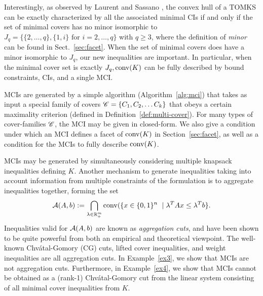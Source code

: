 Interestingly, as observed by Laurent and Sassano \cite{laurent1992characterization}, the convex hull of a TOMKS can be exactly characterized by all the associated minimal CIs if and only if the set of minimal covers has no minor isomorphic to $J_q = \{\{2,\ldots, q\}, \{1,i\} \text{ for }  i = 2, \ldots, q\}$ with $q \geq 3$, where the definition of \emph{minor} can be found in Sect.~\ref{sec:facet}. 
When the set of minimal covers does have a minor isomorphic to $J_q$, our new inequalities are important. In particular, when the minimal cover set is exactly $J_q, \operatorname{conv}(K)$ can be fully described by bound constraints, CIs, and a single MCI. 

MCIs are generated by a simple algorithm (Algorithm~\ref{alg:mci}) that takes as input a special family of covers $\mathscr{C} = \{C_1, C_2, \ldots C_k\}$ that obeys a certain maximality criterion (defined in Definition~\ref{def:multi-cover}).  For many types of cover-families $\mathscr{C}$, the MCI may be given in closed-form.
We also give a condition under which an MCI defines a facet of $\operatorname{conv}(K)$ in Section~\ref{sec:facet}, as well as a condition for the MCIs to fully describe $\operatorname{conv}(K)$. 

MCIs may be generated by simultaneously considering multiple knapsack inequalities defining $K$.
Another mechanism to generate inequalities taking into account information from multiple constraints of the formulation is to aggregate inequalities together, forming the set
\[ \mathcal{A}(A,b) := \bigcap_{\lambda \in \mathbb{R}^m_+} \operatorname{conv}(\{x \in \{0,1\}^n \ \mid \lambda^T A x \leq \lambda^T b \}. \]
Inequalities valid for $\mathcal{A}(A,b)$ are known as \emph{aggregation cuts}, and have been shown to be quite powerful from both an empirical \cite{fukasawa.goycoolea:11} and theoretical \cite{MR3844541} viewpoint.  
The well-known Chv{\'a}tal-Gomory (CG) cuts, lifted cover inequalities, and weight inequalities \cite{weismantel19970} are all aggregation cuts.  In Example~\ref{ex3}, we show that MCIs are not aggregation cuts.  
Furthermore, in Example~\ref{ex4}, we show that MCIs cannot be obtained as a (rank-1)  Chv{\'a}tal-Gomory cut from the linear system consisting of all minimal cover inequalities from $K$.

